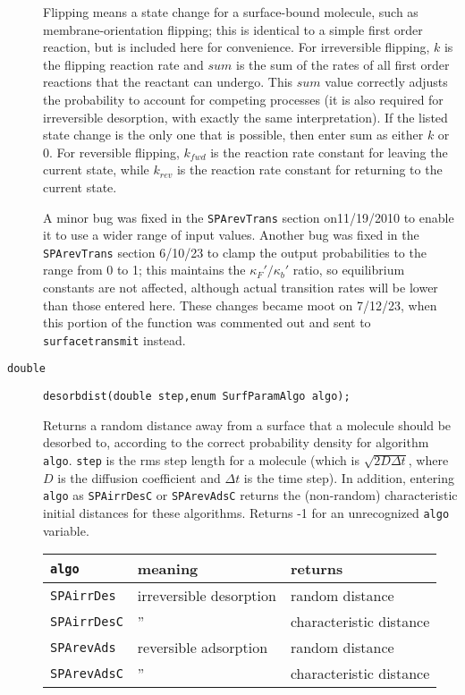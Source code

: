 \documentclass[11pt]{article}
\newcommand {\ttt} {\texttt}
\begin{document}
\begin{description}
Flipping means a state change for a surface-bound molecule, such as membrane-orientation flipping; this is identical to a simple first order reaction, but is included here for convenience. For irreversible flipping, $k$ is the flipping reaction rate and $sum$ is the sum of the rates of all first order reactions that the reactant can undergo. This $sum$ value correctly adjusts the probability to account for competing processes (it is also required for irreversible desorption, with exactly the same interpretation). If the listed state change is the only one that is possible, then enter sum as either $k$ or 0. For reversible flipping, $k_{fwd}$ is the reaction rate constant for leaving the current state, while $k_{rev}$ is the reaction rate constant for returning to the current state.

A minor bug was fixed in the \ttt{SPArevTrans} section on11/19/2010 to enable it to use a wider range of input values. Another bug was fixed in the \ttt{SPArevTrans} section 6/10/23 to clamp the output probabilities to the range from 0 to 1; this maintains the $\kappa_F'/\kappa_b'$ ratio, so equilibrium constants are not affected, although actual transition rates will be lower than those entered here. These changes became moot on 7/12/23, when this portion of the function was commented out and sent to \ttt{surfacetransmit} instead.


\item[\ttt{double}]
\ttt{desorbdist(double step,enum SurfParamAlgo algo);}

Returns a random distance away from a surface that a molecule should be desorbed to, according to the correct probability density for algorithm \ttt{algo}. \ttt{step} is the rms step length for a molecule (which is $\sqrt{2D\Delta t}$, where $D$ is the diffusion coefficient and $\Delta t$ is the time step). In addition, entering \ttt{algo} as \ttt{SPAirrDesC} or \ttt{SPArevAdsC} returns the (non-random) characteristic initial distances for these algorithms. Returns -1 for an unrecognized \ttt{algo} variable.

\begin{longtable}[c]{lll}
\ttt{algo} & meaning & returns \\
\hline
\ttt{SPAirrDes} & irreversible desorption & random distance \\
\ttt{SPAirrDesC} & '' & characteristic distance \\
\ttt{SPArevAds} & reversible adsorption & random distance \\
\ttt{SPArevAdsC} & '' & characteristic distance
\end{longtable}



\end{description}
\end{document}
